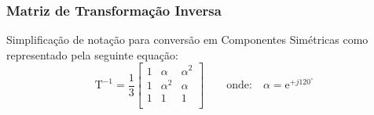 \documentclass{article}
\begin{document}
    \subsubsection{Matriz de Transformação Inversa}
        \begin{definition}
            Simplificação de notação para conversão em Componentes Simétricas como representado pela seguinte equação:
                \begin{equation}
                    \boxed{
                        \text{T}^{-1}
                        = \frac{1}{3}
                        \begin{bmatrix}
                            1 & \alpha     & \alpha^{2}\\
                            1 & \alpha^{2} & \alpha\\
                            1 & 1 & 1\\
                        \end{bmatrix}
                    }
                    \qquad
                    \text{onde:}
                    \quad
                    \alpha = \text{e}^{+j120^{\circ}}
                \end{equation}
        \end{definition}
\end{document}
